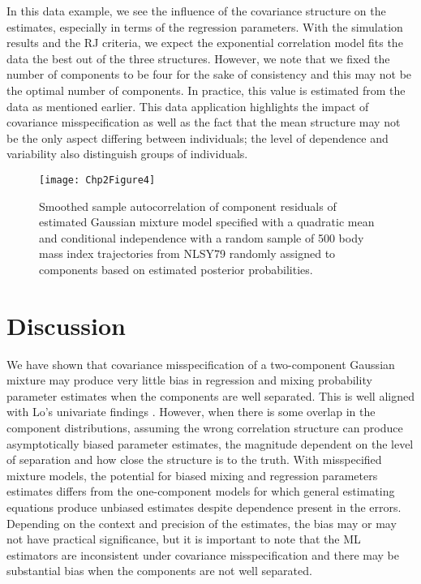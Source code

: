  In this data example, we see the influence of the covariance structure on the estimates, especially in terms of the regression parameters. With the simulation results and the RJ criteria, we expect the exponential correlation model fits the data the best out of the three structures. However, we note that we fixed the number of components to be four for the sake of consistency and this may not be the optimal number of components. In practice, this value is estimated from the data as mentioned earlier. This data application highlights the impact of covariance misspecification as well as the fact that the mean structure may not be the only aspect differing between individuals; the level of dependence and variability also distinguish groups of individuals. 
\begin{figure}
\begin{center}
\texttt{[image: Chp2Figure4]}
\end{center}
\caption{Smoothed sample autocorrelation of component residuals of estimated Gaussian mixture model specified with a quadratic mean and conditional independence with a random sample of 500 body mass index trajectories from NLSY79 randomly assigned to components based on estimated posterior probabilities. }
\label{fig:2-4}
\end{figure}
\section{Discussion}
We have shown that covariance misspecification of a two-component Gaussian mixture may produce very little bias in regression and mixing probability parameter estimates when the components are well separated. This is well aligned with Lo's univariate findings \cite{lo2011}. However, when there is some overlap in the component distributions, assuming the wrong correlation structure can produce asymptotically biased parameter estimates, the magnitude dependent on the level of separation and how close the structure is to the truth. With misspecified mixture models, the potential for biased mixing and regression parameters estimates differs from the one-component models for which general estimating equations \cite{liang1986} produce unbiased estimates despite dependence present in the errors. Depending on the context and precision of the estimates, the bias may or may not have practical significance, but it is important to note that the ML estimators are inconsistent under covariance misspecification and there may be substantial bias when the components are not well separated.

